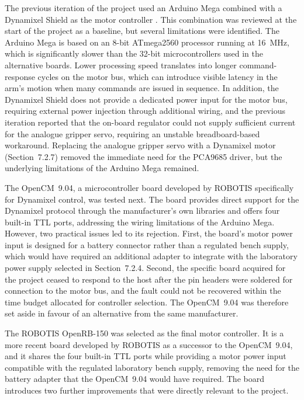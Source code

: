 The previous iteration of the project used an Arduino Mega 
combined with a Dynamixel Shield as the motor controller 
\cite{hivemind}. This combination was reviewed at the start of 
the project as a baseline, but several limitations were 
identified. The Arduino Mega is based on an 8-bit ATmega2560 
processor running at 16~MHz, which is significantly slower than 
the 32-bit microcontrollers used in the alternative boards. 
Lower processing speed translates into longer command-response 
cycles on the motor bus, which can introduce visible latency in 
the arm's motion when many commands are issued in sequence. In 
addition, the Dynamixel Shield does not provide a dedicated 
power input for the motor bus, requiring external power injection 
through additional wiring, and the previous iteration reported 
that the on-board regulator could not supply sufficient current 
for the analogue gripper servo, requiring an unstable 
breadboard-based workaround. Replacing the analogue gripper 
servo with a Dynamixel motor (Section~7.2.7) removed the immediate 
need for the PCA9685 driver, but the underlying limitations of 
the Arduino Mega remained.

The OpenCM~9.04, a microcontroller board developed by ROBOTIS 
specifically for Dynamixel control, was tested next. The board 
provides direct support for the Dynamixel protocol through the 
manufacturer's own libraries and offers four built-in TTL ports, 
addressing the wiring limitations of the Arduino Mega. However, 
two practical issues led to its rejection. First, the board's 
motor power input is designed for a battery connector rather 
than a regulated bench supply, which would have required an 
additional adapter to integrate with the laboratory power supply 
selected in Section~7.2.4. Second, the specific board acquired 
for the project ceased to respond to the host after the pin 
headers were soldered for connection to the motor bus, and the 
fault could not be recovered within the time budget allocated 
for controller selection. The OpenCM~9.04 was therefore set 
aside in favour of an alternative from the same manufacturer.

The ROBOTIS OpenRB-150 was selected as the final motor controller. 
It is a more recent board developed by ROBOTIS as a successor to 
the OpenCM~9.04, and it shares the four built-in TTL ports while 
providing a motor power input compatible with the regulated 
laboratory bench supply, removing the need for the battery 
adapter that the OpenCM~9.04 would have required. The board 
introduces two further improvements that were directly relevant 
to the project.

